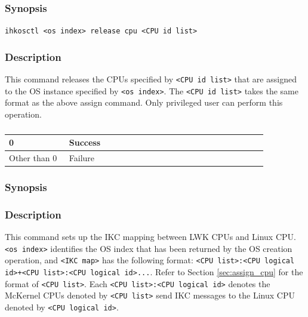 \documentclass[twoside,11pt,fleqn]{book}
\begin{document}
\subsubsection*{Synopsis}{\quad} \texttt{ihkosctl <os index> release cpu <CPU id list>}
\subsubsection*{Description}{\quad}
This command releases the CPUs specified by \texttt{<CPU id list>} that are assigned to the OS instance specified by \texttt{<os index>}.
The \texttt{<CPU id list>} takes the same format as the above assign command.
Only privileged user can perform this operation.

\subsubsection*{}
\begin{table}[!h]
\footnotesize
\begin{tabular}{|p{0.20\linewidth}|p{0.66\linewidth}|} \hline
0&Success\\ \hline
Other than 0&Failure\\ \hline
\end{tabular}
\vspace{-0em}
\end{table}
\FloatBarrier

\subsubsection{}\label{sec:ikc_map_cmd}
\subsubsection*{Synopsis}{\quad} 
\subsubsection*{Description}{\quad}
This command sets up the IKC mapping between LWK CPUs and Linux CPU.
\texttt{<os index>} identifies the OS index
that has been returned by the OS creation operation,
and \texttt{<IKC map>} has the following format:
\texttt{<CPU list>:<CPU logical id>{\lbrack}+<CPU list>:<CPU logical id>...{\rbrack}}.
Refer to Section \ref{sec:assign_cpu} for the format of \texttt{<CPU list>}.
Each \texttt{<CPU list>:<CPU logical id>} denotes the McKernel CPUs denoted by \texttt{<CPU list>} send IKC messages to the Linux CPU denoted by \texttt{<CPU logical id>}.
\end{document}
